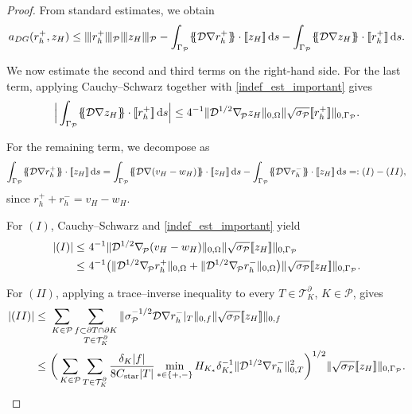 \documentclass[11pt,final]{amsart}
\theoremstyle{plain}
\theoremstyle{definition}
\newcommand\calP{{\mathcal{P}}}
\newcommand\calT{{\mathcal{T}}}
\newcommand{\mesh}{\calP}
\newcommand{\mean}[1]{\{\kern-1.1mm\{#1\}\kern-1.1mm\}}
\newcommand{\jump}[1]{[\![#1]\!]}                        %
\newcommand{\ud}{\,\mathrm{d}}
\newcommand{\ndgp}[1]{| \kern -.25mm \|{#1}| \kern -.25mm \|_{\rm \mesh}}
\newcommand{\norm}[2]{\|{#1}\|_{{#2}}}
\renewcommand{\k}{K}
\newcommand{\bnabla}{\nabla_{\kern-.05cm\mesh}^{}}
\begin{document}
\begin{proof}
From standard estimates, we obtain
\begin{equation}\label{cont_one}
a_{DG}(r_h^+, z_H) \le \ndgp{r_h^+}\ndgp{z_H}
-	\int_{\Gamma_{\calP}}\mean{\mathcal{D}\nabla r_h^+}\cdot\jump{z_H}\ud s
-	\int_{\Gamma_{\calP}}\mean{\mathcal{D}\nabla z_H}\cdot\jump{r_h^+}\ud s.
\end{equation}

We now estimate the second and third terms on the right-hand side.  
For the last term, applying Cauchy--Schwarz together with
\eqref{indef_est_important} gives
\begin{equation}\label{indef_easy}
\Big|\int_{\Gamma_{\calP}}\mean{\mathcal{D}\nabla z_H}\cdot\jump{r_h^+}\ud s\Big|
\le 
4^{-1}\norm{\mathcal{D}^{1/2}\bnabla z_H}{0,\Omega}
\norm{\sqrt{\sigma_\calP}\jump{r_h^+}}{0,\Gamma_{\calP}}.
\end{equation}

For the remaining term, we decompose as
\begin{equation}\label{indef_cool}
\int_{\Gamma_{\calP}}\mean{\mathcal{D}\nabla r_h^+}\cdot\jump{z_H}\ud s
= \int_{\Gamma_{\calP}}\mean{\mathcal{D}\nabla (v_H-w_H)}\cdot\jump{z_H}\ud s
-\int_{\Gamma_{\calP}}\mean{\mathcal{D}\nabla r_h^-}\cdot\jump{z_H}\ud s
=:(I)-(II),
\end{equation}
since $r_h^++r_h^-=v_H-w_H$.

For $(I)$, Cauchy--Schwarz and \eqref{indef_est_important} yield
\[
\begin{aligned}
|(I)|
\le&\ 
4^{-1}\norm{\mathcal{D}^{1/2}\bnabla (v_H-w_H)}{0,\Omega}
\norm{\sqrt{\sigma_\calP}\jump{z_H}}{0,\Gamma_{\calP}}\\
\le&\
4^{-1}\big(\norm{\mathcal{D}^{1/2}\bnabla r_h^+}{0,\Omega}
+\norm{\mathcal{D}^{1/2}\bnabla r_h^-}{0,\Omega}\big)
\norm{\sqrt{\sigma_\calP}\jump{z_H}}{0,\Gamma_{\calP}}.
\end{aligned}
\]

For $(II)$, applying a trace--inverse inequality to every
$T\in\calT_\k^\partial$, $\k\in\mesh$, gives
\[
\begin{aligned}
|(II)|\le&\
\sum_{\k\in\mesh}\sum_{\substack{f\subset \partial T\cap\partial K\\ T\in \mathcal{T}_\k^\partial}}
\norm{\sigma_\calP^{-1/2}\mathcal{D}\nabla r_h^-|_T}{0,f}
\norm{\sqrt{\sigma_\calP}\jump{z_H}}{0,f}\\
\le&\
\bigg(\sum_{\k\in\mesh}\sum_{\substack{T\in \mathcal{T}_\k^\partial}}
\frac{\delta_{\k}|f|}{8C_{\rm star}|T|}
\min_{*\in\{+,-\}}H_{\k_*}\delta_{\k_*}^{-1}
\norm{\mathcal{D}^{1/2}\nabla r_h^-}{0,T}^2\bigg)^{1/2}
\norm{\sqrt{\sigma_\calP}\jump{z_H}}{0,\Gamma_{\calP}}.
\end{aligned}
\]


\end{proof}
\end{document}
